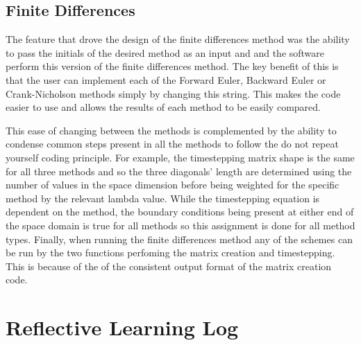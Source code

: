\documentclass[10pt]{article}
\begin{document}
\begin{multicols}{2}
\subsection{Finite Differences}
The feature that drove the design of the finite differences method was the ability to pass the initials of the desired method as an input and and the software perform this version of the finite differences method. The key benefit of this is that the user can implement each of the Forward Euler, Backward Euler or Crank-Nicholson methods simply by changing this string. This makes the code easier to use and allows the results of each method to be easily compared.

This ease of changing between the methods is complemented by the ability to condense common steps present in all the methods to follow the do not repeat yourself coding principle. For example, the timestepping matrix shape is the same for all three methods and so the three diagonals' length are determined using the number of values in the space dimension before being weighted for the specific method by the relevant lambda value. While the timestepping equation is dependent on the method, the boundary conditions being present at either end of the space domain is true for all methods so this assignment is done for all method types. Finally, when running the finite differences method any of the schemes can be run by the two functions perfoming the matrix creation and timestepping. This is because of the of the consistent output format of the matrix creation code.






\section{Reflective Learning Log}







\end{multicols}
\end{document}
